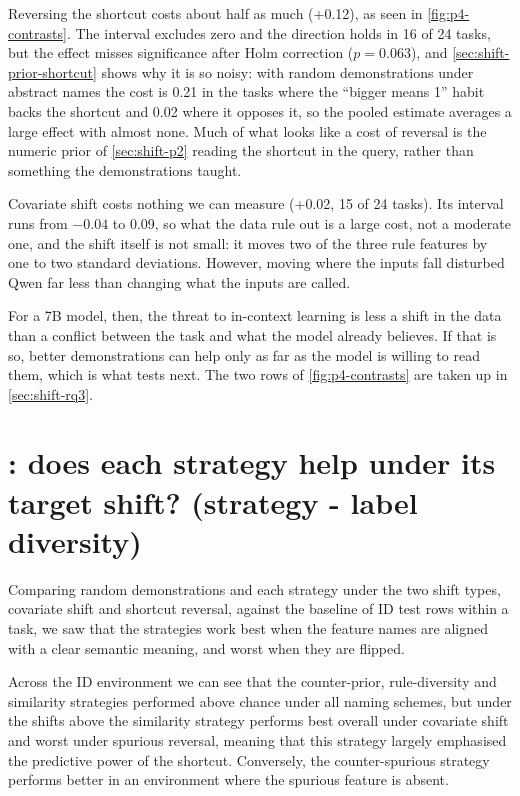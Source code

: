 Reversing the shortcut costs about half as much (+0.12), as seen in \autoref{fig:p4-contrasts}. The interval excludes zero and the direction holds in 16 of 24 tasks, but the effect misses significance after Holm correction ($p = 0.063$), and \autoref{sec:shift-prior-shortcut} shows why it is so noisy: with random demonstrations under abstract names the cost is 0.21 in the tasks where the ``bigger means 1'' habit backs the shortcut and 0.02 where it opposes it, so the pooled estimate averages a large effect with almost none. Much of what looks like a cost of reversal is the numeric prior of \autoref{sec:shift-p2} reading the shortcut in the query, rather than something the demonstrations taught.

Covariate shift costs nothing we can measure (+0.02, 15 of 24 tasks). Its interval runs from $-0.04$ to 0.09, so what the data rule out is a large cost, not a moderate one, and the shift itself is not small: it moves two of the three rule features by one to two standard deviations. However, moving where the inputs fall disturbed Qwen far less than changing what the inputs are called.

For a 7B model, then, the threat to in-context learning is less a shift in the data than a conflict between the task and what the model already believes. If that is so, better demonstrations can help only as far as the model is willing to read them, which is what  tests next. The two  rows of \autoref{fig:p4-contrasts} are taken up in \autoref{sec:shift-rq3}.

\section{: does each strategy help under its target shift? (strategy - label diversity)}
\label{sec:shift-rq2}

Comparing random demonstrations and each strategy under the two shift types, covariate shift and shortcut reversal, against the baseline of ID test rows within a task, we saw that the strategies work best when the feature names are aligned with a clear semantic meaning, and worst when they are flipped.

Across the ID environment we can see that the counter-prior, rule-diversity and similarity strategies performed above chance under all naming schemes, but under the shifts above the similarity strategy performs best overall under covariate shift and worst under spurious reversal, meaning that this strategy largely emphasised the predictive power of the shortcut. Conversely, the counter-spurious strategy performs better in an environment where the spurious feature is absent.

